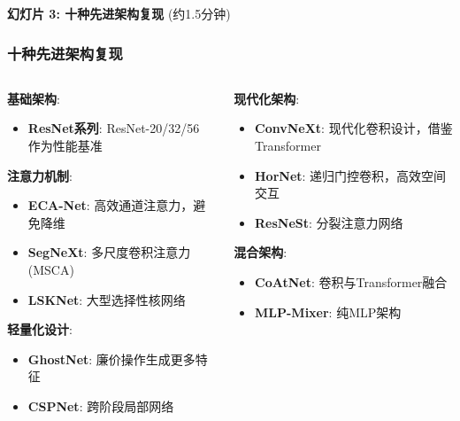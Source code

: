 \documentclass[10pt]{beamer}
\begin{document}
\begin{frame}{\textbf{幻灯片 3: 十种先进架构复现} (约1.5分钟)}
\frametitle{十种先进架构复现}

{\footnotesize
\begin{columns}[T]
    \begin{column}{0.5\textwidth}
        \textbf{基础架构}:
        \begin{itemize}
            \item \textbf{ResNet系列}: ResNet-20/32/56 作为性能基准 \cite{He2016Deep}
        \end{itemize}
        
        \textbf{注意力机制}:
        \begin{itemize}
            \item \textbf{ECA-Net}: 高效通道注意力，避免降维 \cite{Wang_2020_CVPR}
            \item \textbf{SegNeXt}: 多尺度卷积注意力 (MSCA) \cite{Guo2022SegNeXt}
            \item \textbf{LSKNet}: 大型选择性核网络 \cite{Li2023Large}
        \end{itemize}
        
        \textbf{轻量化设计}:
        \begin{itemize}
            \item \textbf{GhostNet}: 廉价操作生成更多特征 \cite{Han2020GhostNet}
            \item \textbf{CSPNet}: 跨阶段局部网络 \cite{Wang2020CSPNet}
        \end{itemize}
    \end{column}
    \begin{column}{0.5\textwidth}
        \textbf{现代化架构}:
        \begin{itemize}
            \item \textbf{ConvNeXt}: 现代化卷积设计，借鉴Transformer \cite{Liu2022ConvNet}
            \item \textbf{HorNet}: 递归门控卷积，高效空间交互 \cite{Rao2022HorNet}
            \item \textbf{ResNeSt}: 分裂注意力网络 \cite{Zhang2022ResNeSt}
        \end{itemize}
        
        \textbf{混合架构}:
        \begin{itemize}
            \item \textbf{CoAtNet}: 卷积与Transformer融合 \cite{Dai2021CoAtNet}
            \item \textbf{MLP-Mixer}: 纯MLP架构 \cite{Tolstikhin2021MLPMixer}
        \end{itemize}
        

\end{column}
\end{columns}}
\end{frame}
\end{document}
